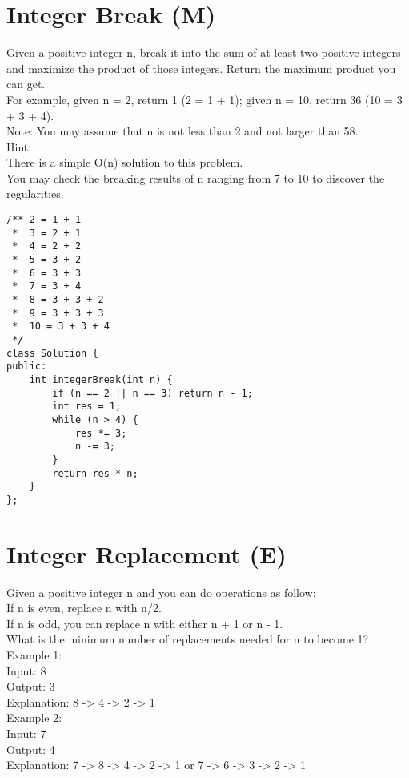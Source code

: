 \section{Integer Break (M)}
Given a positive integer n, break it into the sum of at least two positive integers and maximize the product of those integers. Return the maximum product you can get.\\

For example, given n = 2, return 1 (2 = 1 + 1); given n = 10, return 36 (10 = 3 + 3 + 4).\\

Note: You may assume that n is not less than 2 and not larger than 58.\\

Hint:\\
    There is a simple O(n) solution to this problem.\\
    You may check the breaking results of n ranging from 7 to 10 to discover the regularities.\\

\begin{lstlisting}
/** 2 = 1 + 1
 *  3 = 2 + 1
 *  4 = 2 + 2
 *  5 = 3 + 2
 *  6 = 3 + 3
 *  7 = 3 + 4
 *  8 = 3 + 3 + 2
 *  9 = 3 + 3 + 3
 *  10 = 3 + 3 + 4
 */
class Solution {
public:
    int integerBreak(int n) {
        if (n == 2 || n == 3) return n - 1;
        int res = 1;
        while (n > 4) {
            res *= 3;
            n -= 3;
        }
        return res * n;
    }
};
\end{lstlisting}


\section{Integer Replacement (E)}
Given a positive integer n and you can do operations as follow:\\
    If n is even, replace n with n/2.\\
    If n is odd, you can replace n with either n + 1 or n - 1.\\
What is the minimum number of replacements needed for n to become 1?\\

Example 1:\\
Input:
8\\
Output:
3\\
Explanation:
8 -> 4 -> 2 -> 1\\

Example 2:\\
Input:
7\\
Output:
4\\
Explanation:
7 -> 8 -> 4 -> 2 -> 1
or
7 -> 6 -> 3 -> 2 -> 1\\

